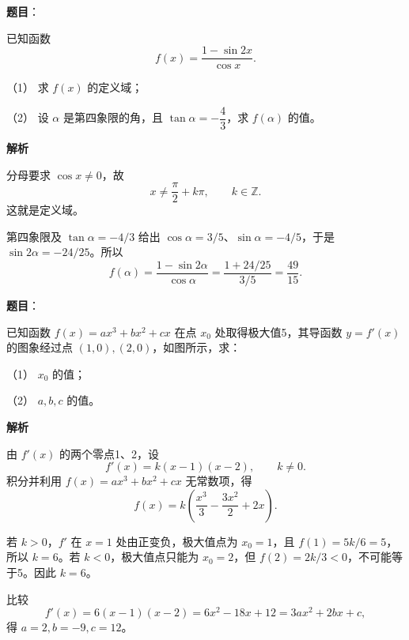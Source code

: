 \begin{answer}

\textbf{题目}：

已知函数
\nopagebreak[4]
\[
f(x)=\frac{1-\sin 2x}{\cos x}.
\]

（1） 求 $f(x)$ 的定义域；

（2） 设 $\alpha$ 是第四象限的角，且 $\tan\alpha=-\dfrac43$，求 $f(\alpha)$ 的值。

\textbf{解析}


分母要求 $\cos x\ne0$，故
\nopagebreak[4]
\[
x\ne\frac\pi2+k\pi,\qquad k\in\mathbb Z.
\]
这就是定义域。


第四象限及 $\tan\alpha=-4/3$ 给出 $\cos\alpha=3/5$、$\sin\alpha=-4/5$，于是 $\sin2\alpha=-24/25$。所以
\nopagebreak[4]
\[
f(\alpha)=\frac{1-\sin2\alpha}{\cos\alpha}
=\frac{1+24/25}{3/5}=\frac{49}{15}.
\]



\end{answer}
\begin{answer}

\textbf{题目}：

已知函数 $f(x)=ax^3+bx^2+cx$ 在点 $x_0$ 处取得极大值5，其导函数 $y=f'(x)$ 的图象经过点 $(1,0),(2,0)$，如图所示，求：

（1） $x_0$ 的值；

（2） $a,b,c$ 的值。
\nopagebreak[4]
\begin{center}\end{center}
\nopagebreak[4]
\textbf{解析}

由 $f'(x)$ 的两个零点1、2，设
\nopagebreak[4]
\[
f'(x)=k(x-1)(x-2),\qquad k\ne0.
\]
积分并利用 $f(x)=ax^3+bx^2+cx$ 无常数项，得
\nopagebreak[4]
\[
f(x)=k\left(\frac{x^3}{3}-\frac{3x^2}{2}+2x\right).
\]


若 $k>0$，$f'$ 在 $x=1$ 处由正变负，极大值点为 $x_0=1$，且 $f(1)=5k/6=5$，所以 $k=6$。若 $k<0$，极大值点只能为 $x_0=2$，但 $f(2)=2k/3<0$，不可能等于5。因此 $k=6$。


比较
\nopagebreak[4]
\[
f'(x)=6(x-1)(x-2)=6x^2-18x+12=3ax^2+2bx+c,
\]
得 $a=2,b=-9,c=12$。



\end{answer}
